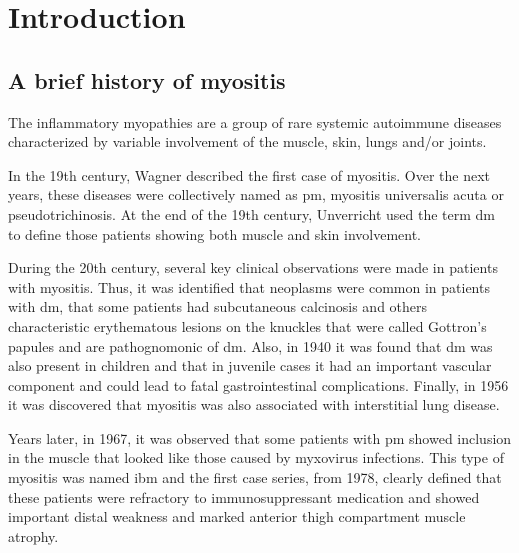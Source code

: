 \chapter{Introduction}

\section{A brief history of myositis}

The inflammatory myopathies are a group of rare systemic autoimmune diseases characterized by variable involvement of the muscle, skin, lungs and/or joints.\cite{SelvaOCallaghan2018}

In the 19th century, Wagner described the first case of myositis.\cite{Wagner1863} Over the next years, these diseases were collectively named as \gls{pm}, myositis universalis acuta or pseudotrichinosis.\cite{Pottain1875,Hepp1887,Unverricht1887,Stertz1916,Kankeleit1916,Patjes1926,Hautveränderungen1930} At the end of the 19th century, Unverricht used the term \gls{dm} to define those patients showing both muscle and skin involvement.\cite{Unverricht1891}

During the 20th century, several key clinical observations were made in patients with myositis. Thus, it was identified that neoplasms were common in patients with \gls{dm}, that some patients had subcutaneous calcinosis and others characteristic erythematous lesions on the knuckles that were called Gottron’s papules and are pathognomonic of \gls{dm}.\cite{Stertz1916,Kankeleit1916,Patjes1926,Hautveränderungen1930} Also, in 1940 it was found that \gls{dm} was also present in children and that in juvenile cases it had an important vascular component and could lead to fatal gastrointestinal complications.\cite{Hecht1940} Finally, in 1956 it was discovered that myositis was also associated with interstitial lung disease.\cite{Mills1956}

Years later, in 1967, it was observed that some patients with \gls{pm} showed inclusion in the muscle that looked like those caused by myxovirus infections.\cite{Chou1967} This type of myositis was named \gls{ibm} and the first case series, from 1978, clearly defined that these patients were refractory to immunosuppressant medication and showed important distal weakness and marked anterior thigh compartment muscle atrophy.\cite{Carpenter1978}

